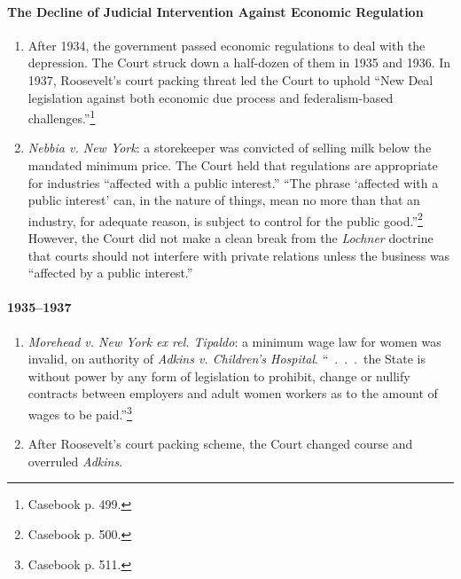 \paragraph{The Decline of Judicial Intervention Against Economic 
Regulation}

\begin{enumerate}
    \item After 1934, the government passed economic regulations to deal with 
    the depression. The Court struck down a half-dozen of them in 1935 and 
    1936. In 1937, Roosevelt's court packing threat led the Court to uphold 
    ``New Deal legislation against both economic due process and 
    federalism-based challenges.''\footnote{Casebook p. 499.}
    \item \emph{Nebbia v. New York}: a storekeeper was convicted of selling 
    milk below the mandated minimum price. The Court held that regulations are 
    appropriate for industries ``affected with a public interest.'' ``The 
    phrase `affected with a public interest' can, in the nature of things, 
    mean no more than that an industry, for adequate reason, is subject to 
    control for the public good.''\footnote{Casebook p. 500.} However, the 
    Court did not make a clean break from the \emph{Lochner} doctrine that 
    courts should not interfere with private relations unless the business was 
    ``affected by a public interest.''
\end{enumerate}

\paragraph{1935--1937}

\begin{enumerate}
    \item \emph{Morehead v. New York ex rel. Tipaldo}: a minimum wage law for 
    women was invalid, on authority of \emph{Adkins v. Children's Hospital}. 
    ``~.~.~.~the State is without power by any form of legislation to 
    prohibit, change or nullify contracts between employers and adult women 
    workers as to the amount of wages to be paid.''\footnote{Casebook p. 511.}
    \item After Roosevelt's court packing scheme, the Court changed course and 
    overruled \emph{Adkins}.
\end{enumerate}

